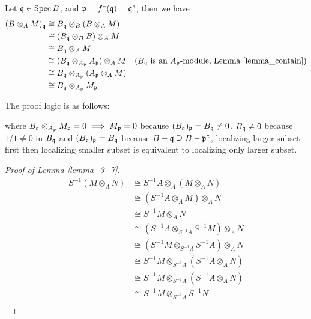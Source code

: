 \begin{longproof}
	Let $\mathfrak{q} \in \operatorname{Spec} B$, and $\mathfrak{p} = f^*(\mathfrak{q}) = \mathfrak{q}^c$, then we have
	\begin{align*}
		(B \otimes_A M)_{\mathfrak{q}} 
		&\cong B_{\mathfrak{q}} \otimes_B (B \otimes_A M) \\
		&\cong (B_{\mathfrak{q}} \otimes_B B) \otimes_A M \\
		&\cong B_{\mathfrak{q}} \otimes_A M \\
		&\cong (B_{\mathfrak{q}} \otimes_{A_{\mathfrak{p}}} A_{\mathfrak{p}}) \otimes_A M &\text{($B_{\mathfrak{q}}$ is an $A_{\mathfrak{p}}$-module, Lemma \ref{lemma_contain})} \\
		&\cong B_{\mathfrak{q}} \otimes_{A_{\mathfrak{p}}} (A_{\mathfrak{p}} \otimes_A M) \\
		&\cong B_{\mathfrak{q}} \otimes_{A_{\mathfrak{p}}} M_{\mathfrak{p}} \\
	\end{align*}
	
	The proof logic is as follows:
	
	\begin{center}
	\end{center}
	
	where $B_{\mathfrak{q}} \otimes_{A_{\mathfrak{p}}} M_{\mathfrak{p}} = 0 \implies M_{\mathfrak{p}} = 0$ because $(B_{\mathfrak{q}})_{\mathfrak{p}} = B_{\mathfrak{q}} \neq 0$. $B_{\mathfrak{q}} \neq 0$ because $1/1 \neq 0$ in $B_{\mathfrak{q}}$ and $(B_{\mathfrak{q}})_{\mathfrak{p}} = B_{\mathfrak{q}}$ because $B - \mathfrak{q} \supseteq B - \mathfrak{p}^e$, localizing larger subset first then localizing smaller subset is equivalent to localizing only larger subset.
\end{longproof}

\begin{proof}[Proof of Lemma \ref{lemma_3_7}]
	\begin{align*}
		S^{-1} (M \otimes_A N)
		&\cong S^{-1} A \otimes_A (M \otimes_A N) \\
		&\cong (S^{-1} A \otimes_A M) \otimes_A N \\
		&\cong S^{-1} M \otimes_A N \\
		&\cong (S^{-1} A \otimes_{S^{-1} A} S^{-1} M) \otimes_A N \\
		&\cong (S^{-1} M \otimes_{S^{-1} A} S^{-1} A) \otimes_A N \\
		&\cong S^{-1} M \otimes_{S^{-1} A} (S^{-1} A \otimes_A N) \\
		&\cong S^{-1} M \otimes_{S^{-1} A} (S^{-1} A \otimes_A N) \\
		&\cong S^{-1} M \otimes_{S^{-1} A} S^{-1} N \\
	\end{align*}
\end{proof}

